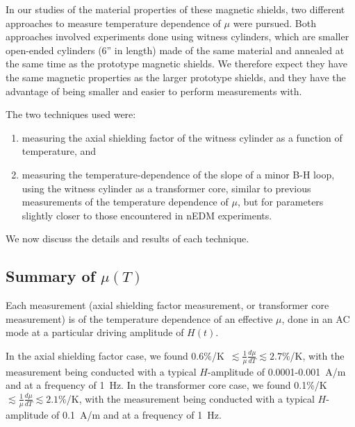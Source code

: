 \documentclass[review]{elsarticle}
\begin{document}

In our studies of the material properties of these magnetic shields,
two different approaches to measure temperature dependence of $\mu$
were pursued.  Both approaches involved experiments done using witness
cylinders, which are smaller open-ended cylinders (6'' in length) made
of the same material and annealed at the same time as the prototype
magnetic shields.  We therefore expect they have the same magnetic
properties as the larger prototype shields, and they have the
advantage of being smaller and easier to perform measurements with.



The two techniques used were:
\begin{enumerate}
\item measuring the axial shielding factor of the witness cylinder as
  a function of temperature, and
\item measuring the temperature-dependence of the slope of a minor B-H
  loop, using the witness cylinder as a transformer core, similar to
  previous measurements of the temperature dependence of $\mu$, but
  for parameters slightly closer to those encountered in nEDM
  experiments.
\end{enumerate}
We now discuss the details and results of each technique.







\subsection{Summary of $\mu(T)$}

Each measurement (axial shielding factor measurement, or transformer
core measurement) is of the temperature dependence of an effective
$\mu$, done in an AC mode at a particular driving amplitude of $H(t)$.

In the axial shielding factor case, we found
0.6\%/K~$\lesssim\frac{1}{\mu}\frac{d\mu}{dT}\lesssim 2.7\%$/K, with
the measurement being conducted with a typical $H$-amplitude of 0.0001-0.001~A/m
and at a frequency of 1~Hz.  In the transformer core case, we found
0.1\%/K~$\lesssim\frac{1}{\mu}\frac{d\mu}{dT}\lesssim 2.1\%$/K, with
the measurement being conducted with a typical $H$-amplitude of
0.1~A/m and at a frequency of 1~Hz.
\end{document}
